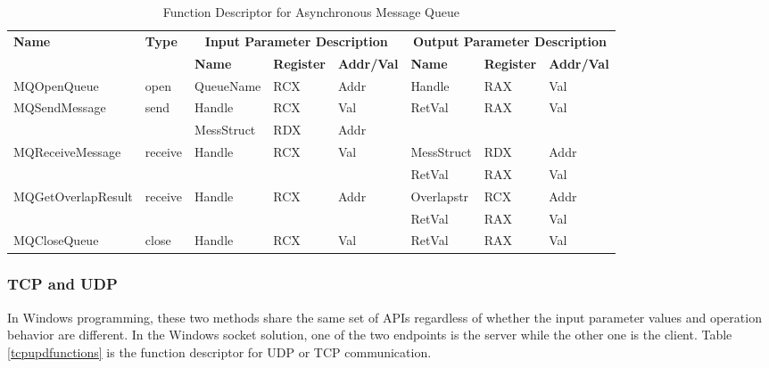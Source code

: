 \begin{table}[H]
  \centering
  \caption{Function Descriptor for Asynchronous Message Queue}
  \label{msmqasynfunctions}
\begin{tabular}{|l|l|l|l|l|l|l|l|}
\hline
             \multirow{2}{*}{{\textbf{Name}}} & \multirow{2}{*}{{\textbf{Type}}} & \multicolumn{3}{c|}{\textbf{Input Parameter Description}} & \multicolumn{3}{c|}{\textbf{Output Parameter Description}} \\
              \cline{3-8} 
             & & \textbf{Name}& \textbf{Register} & \textbf{Addr/Val} & \textbf{Name}& \textbf{Register} &  \textbf{Addr/Val}  \\
             \hline
      MQOpenQueue
       &open & QueueName & RCX  & Addr &  Handle & RAX & Val\\
      \hline                     
      \multirow{2}{*}{MQSendMessage}
       &\multirow{2}{*}{send} &  Handle & RCX & Val & \multirow{2}{*}{RetVal} & \multirow{2}{*}{RAX}  & \multirow{2}{*}{Val} \\
       \cline{3-5}
      & & MessStruct& RDX&Addr &   &  &  \\
      \hline            
           \multirow{2}{*}{MQReceiveMessage}
       &\multirow{2}{*}{receive}&  \multirow{2}{*}{Handle} & \multirow{2}{*}{RCX} & \multirow{2}{*}{Val}& MessStruct& RDX&Addr\\
              \cline{6-8}
      & & & & & RetVal & RAX & Val\\
      \hline    
      \multirow{2}{*}{MQGetOverlapResult} &
       \multirow{2}{*}{receive} &  \multirow{2}{*}{Handle} & \multirow{2}{*}{RCX} & \multirow{2}{*}{Addr} & Overlapstr& RCX&Addr\\
                     \cline{6-8}
      & & & & & RetVal & RAX & Val\\
      \hline      
      MQCloseQueue &
       close &  Handle & RCX & Val & RetVal & RAX & Val\\
      \hline                          
  \end{tabular}   
\end{table}


    
\subsubsection{TCP and UDP}
In Windows programming, these two methods share the same set of APIs regardless of whether the input parameter values and operation behavior are different. In the Windows socket solution, one of the two endpoints is the server while the other one is the client. Table \ref{tcpupdfunctions} is the function descriptor for UDP or TCP communication. 

